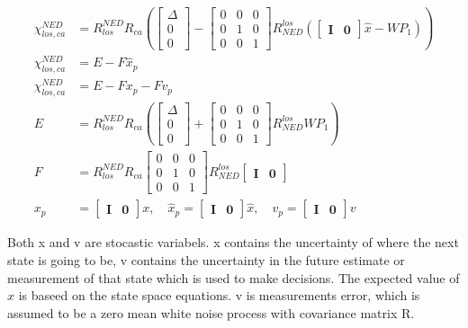 \begin{align}
    \chi^{NED}_{los,ca} & = R^{NED}_{los}  R_{ca} \left(  \begin{bmatrix}\Delta \\ 0 \\ 0\end{bmatrix} - \begin{bmatrix} 0 & 0 & 0 \\ 0 & 1 & 0 \\ 0 & 0 & 1 \end{bmatrix} R^{los}_{NED} (\begin{bmatrix} \mathbf{I} & \mathbf{0} \end{bmatrix} \hat{x} - WP_1) \right) \\
    \chi^{NED}_{los,ca} & = E - F \hat{x}_p \\
    \chi^{NED}_{los,ca} & = E - F x_p - F v_p \\
    E & = R^{NED}_{los}  R_{ca} \left(  \begin{bmatrix}\Delta \\ 0 \\ 0\end{bmatrix} + \begin{bmatrix} 0 & 0 & 0 \\ 0 & 1 & 0 \\ 0 & 0 & 1 \end{bmatrix} R^{los}_{NED} WP_1 \right) \\
    F & = R^{NED}_{los}  R_{ca}  \begin{bmatrix} 0 & 0 & 0 \\ 0 & 1 & 0 \\ 0 & 0 & 1 \end{bmatrix} R^{los}_{NED}  \begin{bmatrix} \mathbf{I} & \mathbf{0} \end{bmatrix} \\
    x_p & = \begin{bmatrix}\mathbf{I}  &\mathbf{0}\end{bmatrix} x, \quad 
    \hat{x}_p  = \begin{bmatrix}\mathbf{I}& \mathbf{0}\end{bmatrix} \hat{x}, \quad
    v_p  = \begin{bmatrix}\mathbf{I}& \mathbf{0}\end{bmatrix} v 
\end{align}

Both x and v are stocastic variabels. x contains the uncertainty of where the next state is going to be, v contains the uncertainty in the future estimate or measurement of that state which is used to make decisions. The expected value of $x$ is baseed on the state space equations. v is measurements error, which is assumed to be a zero mean white noise process with covariance matrix R.

